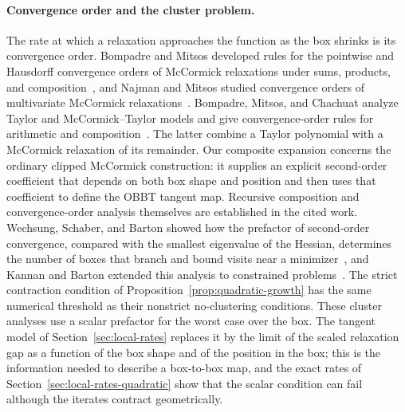 \paragraph{Convergence order and the cluster problem.} The rate at which a
relaxation approaches the function as the box shrinks is its convergence
order. Bompadre and Mitsos developed rules for the pointwise and Hausdorff
convergence orders of McCormick relaxations under sums, products, and
composition~\cite{bompadre2012-convergence-rate-of-mccormick-relaxations},
and Najman and Mitsos studied convergence orders of multivariate McCormick
relaxations~\cite{najman2016-convergence-analysis-of-multivariate-mccormick-relaxations}.
Bompadre, Mitsos, and Chachuat analyze Taylor and McCormick--Taylor models
and give convergence-order rules for arithmetic and
composition~\cite{bompadre2013-convergence-analysis-of-taylor-models}.
The latter combine a Taylor polynomial with a McCormick relaxation of its
remainder.
Our composite expansion concerns the ordinary clipped McCormick
construction: it supplies an explicit second-order coefficient that depends
on both box shape and position and then uses that coefficient to define the
OBBT tangent map. Recursive composition and convergence-order analysis
themselves are established in the cited work.
Wechsung, Schaber, and Barton showed how the prefactor of second-order
convergence, compared with the smallest eigenvalue of the Hessian,
determines the number of boxes that branch and bound visits near a
minimizer~\cite{wechsung2014-the-cluster-problem-revisited}, and Kannan and
Barton extended this analysis to constrained
problems~\cite{kannan2017-the-cluster-problem-in-constrained}. The strict
contraction condition of Proposition~\ref{prop:quadratic-growth} has the
same numerical threshold as their nonstrict no-clustering conditions. These
cluster analyses use a scalar prefactor for
the worst case over the box. The tangent model of
Section~\ref{sec:local-rates} replaces it by the limit of the scaled
relaxation gap as a function of the box shape and of the position in the
box; this is the information needed to describe a box-to-box map, and the
exact rates of Section~\ref{sec:local-rates-quadratic} show that the scalar
condition can fail although the iterates contract geometrically.

